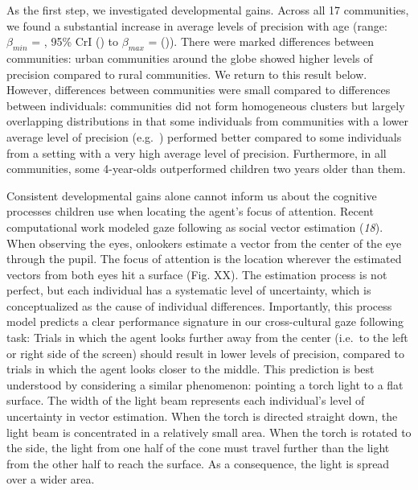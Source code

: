 \documentclass[
  man,floatsintext]{apa6}
\begin{document}
As the first step, we investigated developmental gains. Across all 17 communities, we found a substantial increase in average levels of precision with age (range: \(\beta_{min}\) = , 95\% CrI () to \(\beta_{max}\) = ()). There were marked differences between communities: urban communities around the globe showed higher levels of precision compared to rural communities. We return to this result below. However, differences between communities were small compared to differences between individuals: communities did not form homogeneous clusters but largely overlapping distributions in that some individuals from communities with a lower average level of precision (e.g.~) performed better compared to some individuals from a setting with a very high average level of precision. Furthermore, in all communities, some 4-year-olds outperformed children two years older than them.

Consistent developmental gains alone cannot inform us about the cognitive processes children use when locating the agent's focus of attention. Recent computational work modeled gaze following as social vector estimation (\emph{18}). When observing the eyes, onlookers estimate a vector from the center of the eye through the pupil. The focus of attention is the location wherever the estimated vectors from both eyes hit a surface (Fig. XX). The estimation process is not perfect, but each individual has a systematic level of uncertainty, which is conceptualized as the cause of individual differences. Importantly, this process model predicts a clear performance signature in our cross-cultural gaze following task: Trials in which the agent looks further away from the center (i.e.~to the left or right side of the screen) should result in lower levels of precision, compared to trials in which the agent looks closer to the middle. This prediction is best understood by considering a similar phenomenon: pointing a torch light to a flat surface. The width of the light beam represents each individual's level of uncertainty in vector estimation. When the torch is directed straight down, the light beam is concentrated in a relatively small area. When the torch is rotated to the side, the light from one half of the cone must travel further than the light from the other half to reach the surface. As a consequence, the light is spread over a wider area.
\end{document}
